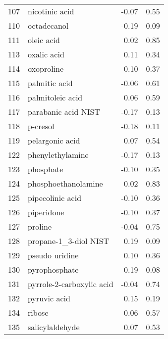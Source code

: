 \begin{tabular}{llrr}
107 &                     nicotinic acid &                -0.07 &     0.55 \\
110 &                        octadecanol &                -0.19 &     0.09 \\
111 &                         oleic acid &                 0.02 &     0.85 \\
113 &                        oxalic acid &                 0.11 &     0.34 \\
114 &                         oxoproline &                 0.10 &     0.37 \\
115 &                      palmitic acid &                -0.06 &     0.61 \\
116 &                   palmitoleic acid &                 0.06 &     0.59 \\
117 &                parabanic acid NIST &                -0.17 &     0.13 \\
118 &                           p-cresol &                -0.18 &     0.11 \\
119 &                    pelargonic acid &                 0.07 &     0.54 \\
122 &                   phenylethylamine &                -0.17 &     0.13 \\
123 &                          phosphate &                -0.10 &     0.35 \\
124 &                phosphoethanolamine &                 0.02 &     0.83 \\
125 &                   pipecolinic acid &                -0.10 &     0.36 \\
126 &                         piperidone &                -0.10 &     0.37 \\
127 &                            proline &                -0.04 &     0.75 \\
128 &              propane-1\_3-diol NIST &                 0.19 &     0.09 \\
129 &                     pseudo uridine &                 0.10 &     0.36 \\
130 &                      pyrophosphate &                 0.19 &     0.08 \\
131 &          pyrrole-2-carboxylic acid &                -0.04 &     0.74 \\
132 &                       pyruvic acid &                 0.15 &     0.19 \\
134 &                             ribose &                 0.06 &     0.57 \\
135 &                    salicylaldehyde &                 0.07 &     0.53 \\

\end{tabular}
